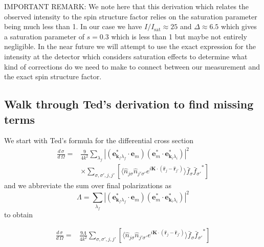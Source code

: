\documentclass[11pt,letter]{article}
\newcommand{\bv}[1]{\ensuremath{\bm{#1}}}
\newcommand{\dsig}[1]{\ensuremath{ \frac{ d\,\sigma_{#1} }{d\,\Omega} }}
\begin{document}
IMPORTANT REMARK:   We note here that this derivation which relates the observed intensity to the spin structure factor relies on the saturation parameter being much less than 1.   In our case we have $I/I_{\mathrm{sat}}\approx 25$ and $\Delta\approx 6.5$ which gives a saturation parameter of $s=0.3$ which is less than 1 but maybe not entirely negligible.   In the near future we will attempt to use the exact expression for the intensity at the detector which considers saturation effects to determine what kind of corrections do we need to make to connect between our measurement and the exact spin structure factor. 

\subsection{Walk through Ted's derivation to find missing terms}\label{sec:Ted}

We start with Ted's formula for the differential cross section
\begin{equation}
\begin{split}
\dsig{} =& \frac{9}{4k^{2}}
              \sum_{\lambda_{f}} | (\bv{e}_{\bv{k}_{f} \lambda_{f}}^{*} \cdot \bv{e}_{m} )
                                   (\bv{e}_{m}^{*} \cdot \bv{e}_{\bv{k}_{i} \lambda_{i}}^{*} )
                                 |^{2} \\
          & \times \sum_{ \sigma,\sigma', j, j' } [ \langle \hat{n}_{j\sigma}\hat{n}_{j'\sigma'}
              e^{ i \bv{K} \cdot ( \hat{\bv{r}}_{j} - \hat{\bv{r}}_{j'} ) } \rangle
              \bar{f}_{\sigma} {\bar{f}_{\sigma'}}^{*} ]
\end{split}
\end{equation}
and we abbreviate the sum over final polarizations as
\begin{equation}
 \Lambda = \sum_{\lambda_{f}} | (\bv{e}_{\bv{k}_{f} \lambda_{f}}^{*} \cdot \bv{e}_{m} )
                                   (\bv{e}_{m}^{*} \cdot \bv{e}_{\bv{k}_{i} \lambda_{i}}^{*} )
                                 |^{2}
\end{equation}
to obtain

\begin{equation}
\begin{split}
\dsig{} =& \frac{9\Lambda}{4k^{2}}
               \sum_{ \sigma,\sigma', j, j' } [ \langle \hat{n}_{j\sigma}\hat{n}_{j'\sigma'}
              e^{ i \bv{K} \cdot ( \hat{\bv{r}}_{j} - \hat{\bv{r}}_{j'} ) } \rangle
              \bar{f}_{\sigma} {\bar{f}_{\sigma'}}^{*} ] \\
\end{split}
\end{equation}
\end{document}
